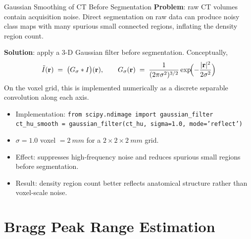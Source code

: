 \documentclass[aspectratio=169, 10pt]{beamer}
\begin{document}
\begin{frame}{Gaussian Smoothing of CT Before Segmentation}
  \textbf{Problem}: raw CT volumes contain acquisition noise. Direct
  segmentation on raw data can produce noisy class maps with many
  spurious small connected regions, inflating the density region count.

  \vspace{8pt}
  \textbf{Solution}: apply a 3-D Gaussian filter before segmentation.
  Conceptually,
  \begin{equation*}
    \tilde{I}(\mathbf{r}) \;=\; \bigl(G_\sigma * I\bigr)(\mathbf{r}),
    \qquad
    G_\sigma(\mathbf{r}) \;=\;
    \frac{1}{(2\pi\sigma^2)^{3/2}}
    \exp\!\Bigl(-\frac{|\mathbf{r}|^2}{2\sigma^2}\Bigr)
  \end{equation*}
  On the voxel grid, this is implemented numerically as a discrete
  separable convolution along each axis.

  \vspace{4pt}
  \begin{itemize}
    \item Implementation:
    \texttt{from scipy.ndimage import gaussian\_filter}
    \\
    \texttt{ct\_hu\_smooth = gaussian\_filter(ct\_hu, sigma=1.0, mode='reflect')}
    \item \(\sigma = 1.0\) voxel \(= \SI{2}{mm}\) for a
    \(2 \times 2 \times \SI{2}{mm}\) grid.
    \item Effect: suppresses high-frequency noise and reduces spurious
    small regions before segmentation.
    \item Result: density region count better reflects anatomical
    structure rather than voxel-scale noise.
  \end{itemize}
\end{frame}

\section{Bragg Peak Range Estimation}
\end{document}
